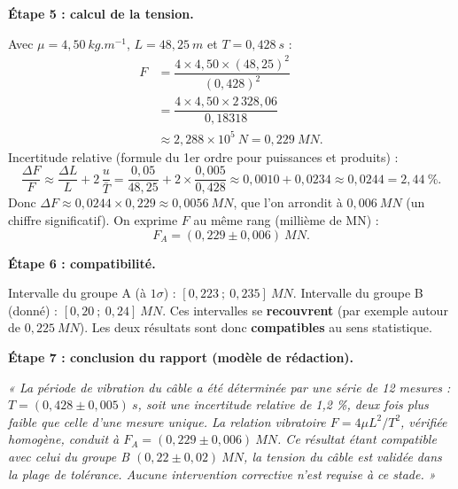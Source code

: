 \documentclass[11pt]{article}
\begin{document}
\begin{exoresolu}
\textbf{Étape 5 : calcul de la tension.}

Avec $\mu = 4{,}50\ \si{kg.m^{-1}}$, $L = 48{,}25\ \si{m}$ et $T = 0{,}428\ \si{s}$ :
\begin{align*}
F &= \dfrac{4 \times 4{,}50 \times (48{,}25)^{2}}{(0{,}428)^{2}} \\
  &= \dfrac{4 \times 4{,}50 \times 2\,328{,}06}{0{,}18318} \\
  &\approx 2{,}288 \times 10^{5}\ \si{N} = 0{,}229\ \si{MN}.
\end{align*}
Incertitude relative (formule du 1er ordre pour puissances et produits) :
\[ \dfrac{\Delta F}{F} \approx \dfrac{\Delta L}{L} + 2\,\dfrac{u}{\bar{T}} = \dfrac{0{,}05}{48{,}25} + 2\times\dfrac{0{,}005}{0{,}428} \approx 0{,}0010 + 0{,}0234 \approx 0{,}0244 = 2{,}44\ \%. \]
Donc $\Delta F \approx 0{,}0244 \times 0{,}229 \approx 0{,}0056\ \si{MN}$, que l'on arrondit à $0{,}006\ \si{MN}$ (un chiffre significatif). On exprime $F$ au même rang (millième de MN) :
\[ \boxed{F_{A} = (0{,}229 \pm 0{,}006)\ \si{MN}}. \]

\textbf{Étape 6 : compatibilité.}

Intervalle du groupe A (à $1\sigma$) : $[0{,}223\ ;\ 0{,}235]\ \si{MN}$.
Intervalle du groupe B (donné) : $[0{,}20\ ;\ 0{,}24]\ \si{MN}$.
Ces intervalles se \textbf{recouvrent} (par exemple autour de $0{,}225\ \si{MN}$). Les deux résultats sont donc \textbf{compatibles} au sens statistique.

\textbf{Étape 7 : conclusion du rapport (modèle de rédaction).}

\emph{« La période de vibration du câble a été déterminée par une série de 12 mesures : $T = (0{,}428 \pm 0{,}005)\ \si{s}$, soit une incertitude relative de 1,2 \%, deux fois plus faible que celle d'une mesure unique. La relation vibratoire $F = 4\mu L^{2}/T^{2}$, vérifiée homogène, conduit à $F_{A} = (0{,}229 \pm 0{,}006)\ \si{MN}$. Ce résultat étant compatible avec celui du groupe B $(0{,}22 \pm 0{,}02)\ \si{MN}$, la tension du câble est validée dans la plage de tolérance. Aucune intervention corrective n'est requise à ce stade. »}
\end{exoresolu}
\end{document}
